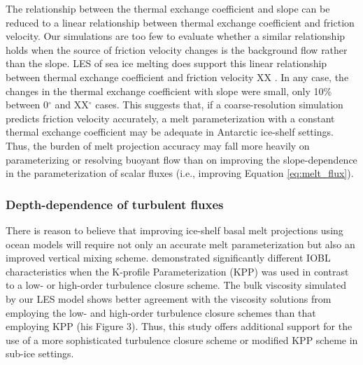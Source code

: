 \documentclass[draft]{agujournal2019}
\begin{document}
The relationship between the thermal exchange coefficient and slope can be reduced to a linear relationship between thermal exchange coefficient and friction velocity. Our simulations are too few to evaluate whether a similar relationship holds when the source of friction velocity changes is the background flow rather than the slope. LES of sea ice melting does support this linear relationship between thermal exchange coefficient and friction velocity XX \cite{ramudu_large_2018}. In any case, the changes in the thermal exchange coefficient with slope were small, only 10\% between 0$^{\circ}$ and XX$^{\circ}$ cases. This suggests that, if a coarse-resolution simulation predicts friction velocity accurately, a melt parameterization with a constant thermal exchange coefficient may be adequate in Antarctic ice-shelf settings. Thus, the burden of melt projection accuracy may fall more heavily on parameterizing or resolving buoyant flow than on improving the slope-dependence in the parameterization of scalar fluxes (i.e., improving Equation \ref{eq:melt_flux}).


\subsubsection{Depth-dependence of turbulent fluxes}

There is reason to believe that improving ice-shelf basal melt projections using ocean models will require not only an accurate melt parameterization but also an improved vertical mixing scheme.  demonstrated significantly different IOBL characteristics when the K-profile Parameterization (KPP) was used in contrast to a low- or high-order turbulence closure scheme. The bulk viscosity simulated by our LES model shows better agreement with the viscosity solutions from  employing the low- and high-order turbulence closure schemes than that employing KPP (his Figure 3). Thus, this study offers additional support for the use of a more sophisticated turbulence closure scheme or modified KPP scheme in sub-ice settings.
\end{document}
